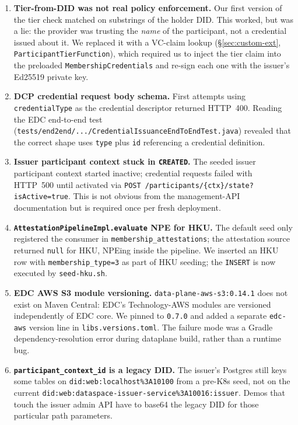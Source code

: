 \documentclass[11pt,a4paper]{article}
\DeclareRobustCommand{\code}[1]{\texttt{\small #1}}
\begin{document}
\begin{enumerate}
  \item \textbf{Tier-from-DID was not real policy enforcement.}
    Our first version of the tier check matched on substrings of the
    holder DID. This worked, but was a lie: the provider was trusting
    the \emph{name} of the participant, not a credential issued about
    it. We replaced it with a VC-claim lookup
    (§\ref{sec:custom-ext}, \code{ParticipantTierFunction}), which
    required us to inject the tier claim into the preloaded
    \code{MembershipCredentials} and re-sign each one with the
    issuer's Ed25519 private key.

  \item \textbf{DCP credential request body schema.} First attempts
    using \code{credentialType} as the credential descriptor returned
    HTTP~400. Reading the EDC end-to-end test
    (\code{tests/end2end/.../CredentialIssuanceEndToEndTest.java})
    revealed that the correct shape uses \code{type} plus \code{id}
    referencing a credential definition.

  \item \textbf{Issuer participant context stuck in \code{CREATED}.}
    The seeded issuer participant context started inactive; credential
    requests failed with HTTP~500 until activated via
    \code{POST /participants/\{ctx\}/state?isActive=true}. This is
    not obvious from the management-API documentation but is required
    once per fresh deployment.

  \item \textbf{\code{AttestationPipelineImpl.evaluate} NPE for HKU.}
    The default seed only registered the consumer in
    \code{membership\_attestations}; the attestation source returned
    \code{null} for HKU, NPEing inside the pipeline. We inserted an
    HKU row with \code{membership\_type=3} as part of HKU seeding;
    the \code{INSERT} is now executed by \code{seed-hku.sh}.

  \item \textbf{EDC AWS S3 module versioning.}
    \code{data-plane-aws-s3:0.14.1} does not exist on Maven Central:
    EDC's Technology-AWS modules are versioned independently of
    EDC core. We pinned to \code{0.7.0} and added a separate
    \code{edc-aws} version line in \code{libs.versions.toml}. The
    failure mode was a Gradle dependency-resolution error during
    dataplane build, rather than a runtime bug.

  \item \textbf{\code{participant\_context\_id} is a legacy DID.} The
    issuer's Postgres still keys some tables on
    \code{did:web:localhost\%3A10100} from a pre-K8s seed, not on the
    current \code{did:web:dataspace-issuer-service\%3A10016:issuer}.
    Demos that touch the issuer admin API have to base64 the legacy
    DID for those particular path parameters.


\end{enumerate}
\end{document}
